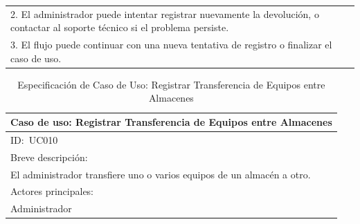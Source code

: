 \documentclass[stu, 12pt, letterpaper, donotrepeattitle, floatsintext, natbib]{apa7}
\begin{document}
\begin{longtable}{@{} p{16.5cm} @{}}
    \hspace{1cm}2. El administrador puede intentar registrar nuevamente la devolución, o contactar al soporte técnico si el problema persiste.                                                                                       \\
    \hspace{1cm}3. El flujo puede continuar con una nueva tentativa de registro o finalizar el caso de uso.                                                                                                                          \\ \bottomrule
\end{longtable}
\newpage
\begin{longtable}{@{} p{16.5cm} @{}}
    \caption{Especificación de Caso de Uso: Registrar Transferencia de Equipos entre Almacenes}\label{tab:UC010}                                                                                                                           \\ \toprule
    \multicolumn{1}{c}{Caso de uso: Registrar Transferencia de Equipos entre Almacenes}                                                                                                                                                    \\ \midrule
    ID:~UC010                                                                                                                                                                                                                              \\ \midrule
    Breve descripción:                                                                                                                                                                                                                     \\
    El administrador transfiere uno o varios equipos de un almacén a otro.                                                                                                                                                                 \\ \midrule
    Actores principales:                                                                                                                                                                                                                   \\
    Administrador                                                                                                                                                                                                                          \\ \midrule

\end{longtable}
\end{document}
